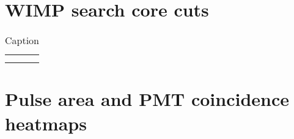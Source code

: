 \section{WIMP search core cuts}

\begin{table}[]
    \centering
    \begin{tabular}{c|c}
         &  \\
         & 
    \end{tabular}
    \caption{Caption}
    \label{tab:App_VetoEff/CoreCuts}
\end{table}

\section{Pulse area and PMT coincidence heatmaps}\label{app:VetoHeatMapsSec}